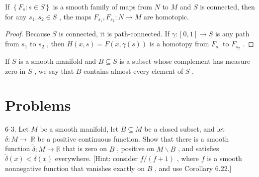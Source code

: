 \begin{proposition}
\label{prop:6-34}
\leanok
{}
If $\left\{  {{F}_{s} : s \in  S}\right\}$ is a smooth family of maps from $N$ to $M$ and $S$ is connected, then for any ${s}_{1},{s}_{2} \in  S$ , the maps ${F}_{{s}_{1}},{F}_{{s}_{2}} : N \rightarrow  M$ are homotopic.
\end{proposition}

\begin{proof}
\leanok
Because $S$ is connected, it is path-connected. If $\gamma  : \left\lbrack  {0,1}\right\rbrack   \rightarrow  S$ is any path from ${s}_{1}$ to ${s}_{2}$ , then $H\left( {x, s}\right)  = F\left( {x,\gamma \left( s\right) }\right)$ is a homotopy from ${F}_{{s}_{1}}$ to ${F}_{{s}_{2}}$ .
\end{proof}

\begin{definition}
\label{def:6-44-extra-3}
\leanok
If $S$ is a smooth manifold and $B \subseteq  S$ is a subset whose complement has measure zero in $S$ , we say that $B$ contains almost every element of $S$ .
\end{definition}


\section{Problems}

\begin{exercise}
\label{prob:6-3}
\leanok
{}
6-3. Let $M$ be a smooth manifold, let $B \subseteq  M$ be a closed subset, and let $\delta  : M \rightarrow \; \mathbb{R}$ be a positive continuous function. Show that there is a smooth function $\widetilde{\delta } : M \rightarrow  \mathbb{R}$ that is zero on $B$ , positive on $M \smallsetminus  B$ , and satisfies $\widetilde{\delta }\left( x\right)  < \delta \left( x\right)$ everywhere. [Hint: consider $f/\left( {f + 1}\right)$ , where $f$ is a smooth nonnegative function that vanishes exactly on $B$ , and use Corollary 6.22.]
\end{exercise}


